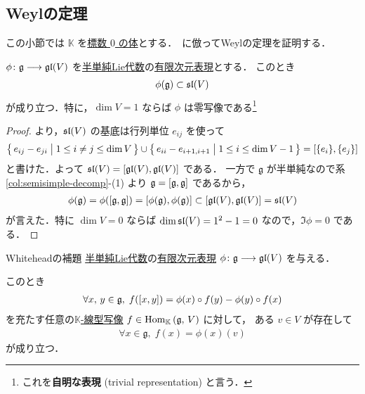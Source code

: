 \documentclass[rep_main]{subfiles}
\begin{document}
\subsection{Weylの定理}

この小節では $\mathbb{K}$ を\underline{標数 $0$ の体}とする．~\cite[第7章, p.80-86]{Satake1987LieAlg}に倣ってWeylの定理を証明する．

\begin{mylem}[label=lem:Weyl]{}
	$\phi \colon \mathfrak{g} \longrightarrow \mathfrak{gl} (V)$ を\hyperref[def:semisimple-LieAlg]{半単純Lie代数}の\underline{有限次元}\hyperref[ax:g-module]{表現}とする．
	このとき
	\begin{align}
		\phi(\mathfrak{g}) \subset \mathfrak{sl} (V)
	\end{align}
	が成り立つ．特に，$\dim V = 1$ ならば $\phi$ は零写像である\footnote{これを\textbf{自明な表現} (trivial representation) と言う．}
\end{mylem}

\begin{proof}
	より，$\mathfrak{sl} (V)$ の基底は行列単位 $e_{ij}$ を使って
	\begin{align}
		\bigl\{\, e_{ij} - e_{ji} \bigm| 1 \le i\neq j \le \dim V \,\bigr\} \cup \bigl\{\, e_{ii} - e_{i+1,i+1} \bigm| 1 \le i \le \dim V - 1 \,\bigr\} = \comm{\{e_i\}}{\{e_j\}}
	\end{align}
	と書けた．よって $\Lsl (V) = \comm{\Lgl(V)}{\Lgl(V)}$ である．
	一方で $\mathfrak{g}$ が半単純なので系\ref{col:semisimple-decomp}-(1) より $\mathfrak{g} = \comm{\mathfrak{g}}{\mathfrak{g}}$ であるから，
	\begin{align}
		\phi(\mathfrak{g}) = \phi(\comm{\mathfrak{g}}{\mathfrak{g}}) = \comm{\phi(\mathfrak{g})}{\phi(\mathfrak{g})} \subset \comm{\Lgl(V)}{\Lgl(V)} = \Lsl(V)
	\end{align}
	が言えた．特に $\dim V = 0$ ならば $\dim \mathfrak{sl}(V) = 1^2 - 1 = 0$ なので，$\Im \phi = 0$ である． 
\end{proof}

\begin{mylem}[label=lem:Whitehead]{Whiteheadの補題}
	\hyperref[def:semisimple-LieAlg]{半単純Lie代数}の\underline{有限次元}\hyperref[ax:g-module]{表現} $\phi \colon \mathfrak{g} \longrightarrow \mathfrak{gl} (V)$ を与える．
	
	このとき
	\begin{align}
		\label{eq:cocycle}
		\forall x,\, y \in \mathfrak{g},\; f(\comm{x}{y}) = \phi(x) \circ f(y) - \phi(y) \circ f(x)
	\end{align}
	を充たす任意の\underline{$\mathbb{K}$-線型写像} $f \in \mathrm{Hom}_{\mathbb{K}} \mathop{}(\mathfrak{g},\, V)$ に対して，
	ある $v \in V$ が存在して
	\begin{align}
		\forall x \in \mathfrak{g},\; f(x) = \phi(x)(v)
	\end{align}
	が成り立つ．
\end{mylem}
\end{document}
